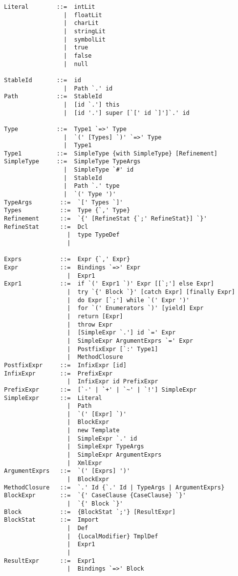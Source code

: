 \begin{lstlisting}
  Literal        ::=  intLit
                   |  floatLit
                   |  charLit
                   |  stringLit
                   |  symbolLit
                   |  true
                   |  false
                   |  null

  StableId       ::=  id
                   |  Path `.' id
  Path           ::=  StableId
                   |  [id `.'] this
                   |  [id '.'] super [`[' id `]']`.' id

  Type           ::=  Type1 `=>' Type
                   |  `(' [Types] `)' `=>' Type
                   |  Type1
  Type1          ::=  SimpleType {with SimpleType} [Refinement]
  SimpleType     ::=  SimpleType TypeArgs
                   |  SimpleType `#' id
                   |  StableId
                   |  Path `.' type
                   |  `(' Type ')'
  TypeArgs        ::=  `[' Types `]'
  Types           ::=  Type {`,' Type}
  Refinement      ::=  `{' [RefineStat {`;' RefineStat}] `}'
  RefineStat      ::=  Dcl
                    |  type TypeDef
                    |

  Exprs           ::=  Expr {`,' Expr}
  Expr            ::=  Bindings `=>' Expr
                    |  Expr1
  Expr1           ::=  if `(' Expr1 `)' Expr [[`;'] else Expr]
                    |  try `{' Block `}' [catch Expr] [finally Expr]
                    |  do Expr [`;'] while `(' Expr ')'
                    |  for `(' Enumerators `)' [yield] Expr
                    |  return [Expr]
                    |  throw Expr
                    |  [SimpleExpr `.'] id `=' Expr
                    |  SimpleExpr ArgumentExprs `=' Expr
                    |  PostfixExpr [`:' Type1]
                    |  MethodClosure
  PostfixExpr     ::=  InfixExpr [id]
  InfixExpr       ::=  PrefixExpr
                    |  InfixExpr id PrefixExpr
  PrefixExpr      ::=  [`-' | `+' | `~' | `!'] SimpleExpr 
  SimpleExpr      ::=  Literal
                    |  Path
                    |  `(' [Expr] `)'
                    |  BlockExpr
                    |  new Template 
                    |  SimpleExpr `.' id 
                    |  SimpleExpr TypeArgs
                    |  SimpleExpr ArgumentExprs
                    |  XmlExpr
  ArgumentExprs   ::=  `(' [Exprs] ')'
                    |  BlockExpr
  MethodClosure   ::=  `.' Id {`.' Id | TypeArgs | ArgumentExprs}
  BlockExpr       ::=  `{' CaseClause {CaseClause} `}'
                    |  `{' Block `}'
  Block           ::=  {BlockStat `;'} [ResultExpr]
  BlockStat       ::=  Import
                    |  Def
                    |  {LocalModifier} TmplDef
                    |  Expr1
                    |
  ResultExpr      ::=  Expr1
                    |  Bindings `=>' Block


\end{lstlisting}
